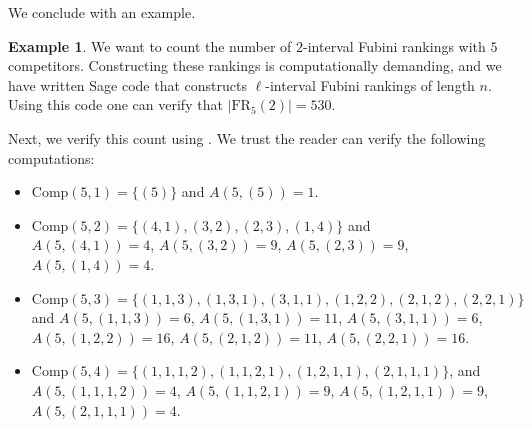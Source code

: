 \documentclass{amsart}
\theoremstyle{definition}
\newtheorem{example}{Example}[section]
\theoremstyle{definition}
\theoremstyle{remark}
\newcommand{\FR}[1]{\mathrm{FR}_{#1}}
\newcommand{\Comp}{\mathrm{Comp}}
\begin{document}
We conclude with an example.

\begin{example}
We want to count the number of $2$-interval Fubini rankings with $5$ competitors. 
Constructing these rankings is computationally demanding, and we have written Sage code \cite{github} that constructs $\ell$-interval Fubini rankings of length $n$.
Using this code one can verify that $|\FR{5}(2)|=530$.

Next, we verify this count using . 
We trust the reader can verify the following computations:
\begin{itemize}[leftmargin=.2in]
     \item $\Comp(5,1)=\{(5)\}$ and $A(5,(5))=1$.
     
     \item  $\Comp(5,2)=\{(4,1), (3,2), (2,3), (1,4)\}$ and \\ $A(5,(4,1))=4$, $A(5,(3,2))= 9$, $A(5,(2,3))=9$, $A(5,(1,4))=4$. 

     
     \item  $\Comp(5,3)=\{(1,1,3), (1,3,1), (3,1,1),(1,2,2),(2,1,2),(2,2,1)\}$ and  $A(5,(1,1,3))=6$, $A(5,(1,3,1))=11$, $A(5,(3,1,1))=6$, $A(5,(1,2,2))=16$, $A(5,(2,1,2))=11$, $A(5,(2,2,1))=16$.


   \item $\Comp(5,4)=\{(1,1,1,2), (1,1,2,1), (1,2,1,1),(2,1,1,1)\}$, and $A(5,(1,1,1,2))=4$, $A(5,(1,1,2,1))=9$, $A(5,(1,2,1,1))=9$, $A(5,(2,1,1,1))=4$.


\end{itemize}
\end{example}
\end{document}
